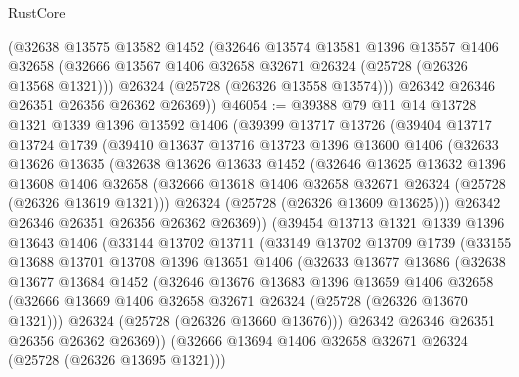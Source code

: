 \begin{lexlean}{RustCore}
\begin{coremodule}
      (@32638
        @13575
        @13582
        @1452
        (@32646
          @13574
          @13581
          @1396
          @13557
          @1406
          @32658
          (@32666 @13567 @1406 @32658 @32671 @26324 (@25728 (@26326 @13568 @1321)))
          @26324
          (@25728 (@26326 @13558 @13574)))
        @26342
        @26346
        @26351
        @26356
        @26362
        @26369))
@46054 := @39388
    @79
    @11
    @14
    @13728
    @1321
    @1339
    @1396
    @13592
    @1406
    (@39399
      @13717
      @13726
      (@39404
        @13717
        @13724
        @1739
        (@39410
          @13637
          @13716
          @13723
          @1396
          @13600
          @1406
          (@32633
            @13626
            @13635
            (@32638
              @13626
              @13633
              @1452
              (@32646
                @13625
                @13632
                @1396
                @13608
                @1406
                @32658
                (@32666 @13618 @1406 @32658 @32671 @26324 (@25728 (@26326 @13619 @1321)))
                @26324
                (@25728 (@26326 @13609 @13625)))
              @26342
              @26346
              @26351
              @26356
              @26362
              @26369))
          (@39454
            @13713
            @1321
            @1339
            @1396
            @13643
            @1406
            (@33144
              @13702
              @13711
              (@33149
                @13702
                @13709
                @1739
                (@33155
                  @13688
                  @13701
                  @13708
                  @1396
                  @13651
                  @1406
                  (@32633
                    @13677
                    @13686
                    (@32638
                      @13677
                      @13684
                      @1452
                      (@32646
                        @13676
                        @13683
                        @1396
                        @13659
                        @1406
                        @32658
                        (@32666 @13669 @1406 @32658 @32671 @26324 (@25728 (@26326 @13670 @1321)))
                        @26324
                        (@25728 (@26326 @13660 @13676)))
                      @26342
                      @26346
                      @26351
                      @26356
                      @26362
                      @26369))
                  (@32666 @13694 @1406 @32658 @32671 @26324 (@25728 (@26326 @13695 @1321)))

\end{coremodule}
\end{lexlean}
